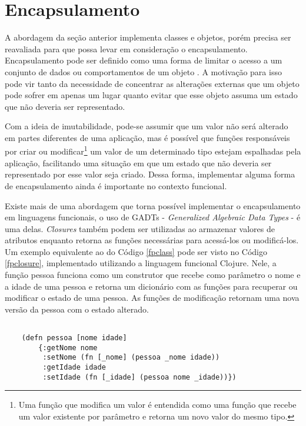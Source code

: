 \section{Encapsulamento}

A abordagem da seção anterior implementa 
classes e objetos, porém precisa ser 
reavaliada para que possa levar em consideração 
o encapsulamento. Encapsulamento pode ser definido 
como uma forma de limitar o acesso a um conjunto 
de dados ou comportamentos de um objeto \cite{quarkoo}. 
A motivação para isso pode vir tanto da necessidade 
de concentrar as alterações externas que um objeto 
pode sofrer em apenas um lugar quanto evitar que 
esse objeto assuma um estado que não deveria ser 
representado. 

Com a ideia de imutabilidade, pode-se 
assumir que um valor não será alterado em partes 
diferentes de uma aplicação, mas é possível 
que funções responsáveis por criar ou modificar\footnote{
    Uma função que modifica um valor é entendida 
    como uma função que recebe um valor existente 
    por parâmetro e retorna um novo valor do mesmo 
    tipo.
} 
um valor de um determinado tipo estejam 
espalhadas pela aplicação, facilitando uma 
situação em que um estado que não deveria ser 
representado por esse valor seja criado. 
Dessa forma, implementar alguma forma de 
encapsulamento ainda é importante no 
contexto funcional.

Existe mais de uma abordagem que torna 
possível implementar o encapsulamento em 
linguagens funcionais, o uso de GADTs - 
\textit{Generalized Algebraic 
Data Types}\cite{existentialhaskell} - é uma 
delas. \textit{Closures} também podem 
ser utilizadas ao armazenar valores de 
atributos enquanto retorna as funções 
necessárias para acessá-los ou modificá-los. 
Um exemplo equivalente ao do Código \ref{fpclass} 
pode ser visto no Código \ref{fpclosure}, 
implementado utilizando a linguagem funcional Clojure. 
\cite{classlessjs} Nele, a função pessoa 
funciona como um construtor que recebe como 
parâmetro o nome e a idade de uma pessoa e 
retorna um dicionário com as funções para 
recuperar ou modificar o estado de uma pessoa.
As funções de modificação retornam uma nova versão 
da pessoa com o estado alterado.

\begin{lstlisting}[caption={Representação de uma classe com \textit{closures}.},label=fpclosure]
    
    (defn pessoa [nome idade]
        {:getNome nome
         :setNome (fn [_nome] (pessoa _nome idade))
         :getIdade idade
         :setIdade (fn [_idade] (pessoa nome _idade))})

\end{lstlisting}

